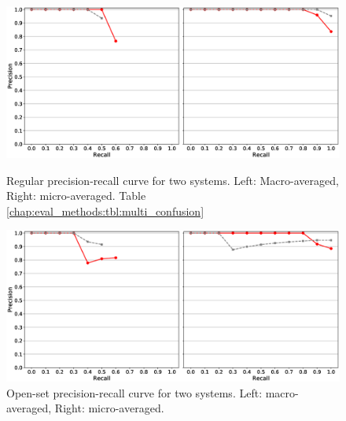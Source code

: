 \begin{figure}[p]

	\begin{center}
		\includegraphics[scale=0.38]{Figures/prc_macro_micro.eps}
		\caption{Regular precision-recall curve for two systems. Left: Macro-averaged, Right: micro-averaged. Table \ref{chap:eval_methods:tbl:multi_confusion}}
		\label{chap:eval_methods:fig:prc}
	\end{center}

	\begin{center}
    	\includegraphics[scale=0.38]{Figures/prc_macro_micro_count_noise.eps}
		\caption{Open-set precision-recall curve for two systems. Left: macro-averaged, Right: micro-averaged.}
		\label{chap:eval_methods:fig:prc_noise}
	\end{center}
\end{figure}



